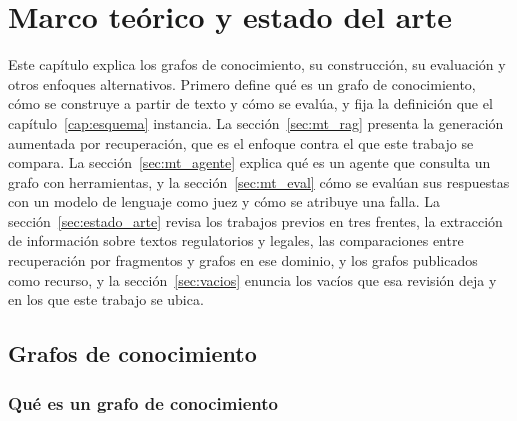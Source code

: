 \documentclass[12pt,a4paper]{report}
\begin{document}


\chapter{Marco teórico y estado del arte}
\label{cap:marco}

Este capítulo explica los grafos de conocimiento, su construcción, su evaluación y otros enfoques alternativos. Primero define qué es un grafo de conocimiento, cómo se construye a partir de texto y cómo se evalúa, y fija la definición que el capítulo~\ref{cap:esquema} instancia. La sección~\ref{sec:mt_rag} presenta la generación aumentada por recuperación, que es el enfoque contra el que este trabajo se compara. La sección~\ref{sec:mt_agente} explica qué es un agente que consulta un grafo con herramientas, y la sección~\ref{sec:mt_eval} cómo se evalúan sus respuestas con un modelo de lenguaje como juez y cómo se atribuye una falla. La sección~\ref{sec:estado_arte} revisa los trabajos previos en tres frentes, la extracción de información sobre textos regulatorios y legales, las comparaciones entre recuperación por fragmentos y grafos en ese dominio, y los grafos publicados como recurso, y la sección~\ref{sec:vacios} enuncia los vacíos que esa revisión deja y en los que este trabajo se ubica.

\section{Grafos de conocimiento}
\label{sec:mt_kg}

\subsection{Qué es un grafo de conocimiento}
\end{document}
